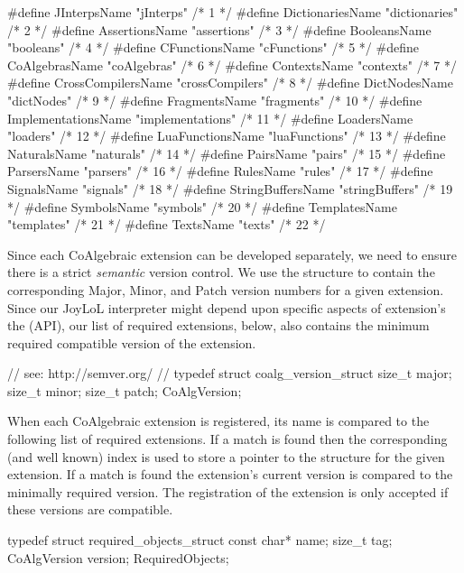 #define JInterpsName        "jInterps"        /*  1 */
#define DictionariesName    "dictionaries"    /*  2 */
#define AssertionsName      "assertions"      /*  3 */
#define BooleansName        "booleans"        /*  4 */
#define CFunctionsName      "cFunctions"      /*  5 */
#define CoAlgebrasName      "coAlgebras"      /*  6 */
#define ContextsName        "contexts"        /*  7 */
#define CrossCompilersName  "crossCompilers"  /*  8 */
#define DictNodesName       "dictNodes"       /*  9 */
#define FragmentsName       "fragments"       /* 10 */
#define ImplementationsName "implementations" /* 11 */
#define LoadersName         "loaders"         /* 12 */
#define LuaFunctionsName    "luaFunctions"    /* 13 */
#define NaturalsName        "naturals"        /* 14 */
#define PairsName           "pairs"           /* 15 */
#define ParsersName         "parsers"         /* 16 */
#define RulesName           "rules"           /* 17 */
#define SignalsName         "signals"         /* 18 */
#define StringBuffersName   "stringBuffers"   /* 19 */
#define SymbolsName         "symbols"         /* 20 */
#define TemplatesName       "templates"       /* 21 */
#define TextsName           "texts"           /* 22 */
\stopCHeader

Since each CoAlgebraic extension can be developed separately, we need to 
ensure there is a strict \emph{semantic} version control. We use the 
 structure to contain the corresponding Major, Minor, 
and Patch version numbers for a given extension. Since our JoyLoL 
interpreter might depend upon specific aspects of extension's the 
 (API), our list of required 
extensions, below, also contains the minimum required compatible version 
of the extension. 

\startCHeader
// see: http://semver.org/
//
typedef struct coalg_version_struct {
  size_t major;
  size_t minor;
  size_t patch;
} CoAlgVersion;
\stopCHeader

When each CoAlgebraic extension is registered, its name is compared to the 
following list of required extensions. If a match is found then the 
corresponding (and well known) index is used to store a pointer to the 
 structure for the given extension. If a match is found 
the extension's current version is compared to the minimally required 
version. The registration of the extension is only accepted if these 
versions are compatible. 

\startCHeader
typedef struct required_objects_struct {
  const char*  name;
  size_t       tag;
  CoAlgVersion version;
} RequiredObjects;

